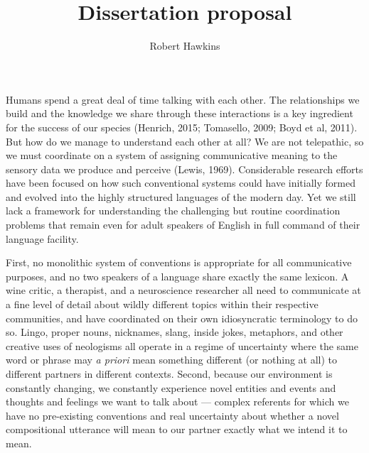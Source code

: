 \documentclass[12pt, donotrepeattitle, man, floatsintext]{apa6}
\title{Dissertation proposal}
\author{Robert Hawkins}
\affiliation{Stanford University}
\begin{document}
\thispagestyle{otherpage}

\maketitle

Humans spend a great deal of time talking with each other. The relationships we build and the knowledge we share through these interactions is a key ingredient for the success of our species (Henrich, 2015; Tomasello, 2009; Boyd et al, 2011). But how do we manage to understand each other at all? We are not telepathic, so we must coordinate on a system of assigning communicative meaning to the sensory data we produce and perceive (Lewis, 1969). Considerable research efforts have been focused on how such conventional systems could have initially formed and evolved into the highly structured languages of the modern day. Yet we still lack a framework for understanding the challenging but routine coordination problems that remain even for adult speakers of English in full command of their language facility. 

First, no monolithic system of conventions is appropriate for all communicative purposes, and no two speakers of a language share exactly the same lexicon. A wine critic, a therapist, and a neuroscience researcher all need to communicate at a fine level of detail about wildly different topics within their respective communities, and have coordinated on their own idiosyncratic terminology to do so. Lingo, proper nouns, nicknames, slang, inside jokes, metaphors, and other creative uses of neologisms all operate in a regime of uncertainty where the same word or phrase may \emph{a priori} mean something different (or nothing at all) to different partners in different contexts. Second, because our environment is constantly changing, we constantly experience novel entities and events and thoughts and feelings we want to talk about --- complex referents for which we have no pre-existing conventions and real uncertainty about whether a novel compositional utterance will mean to our partner exactly what we intend it to mean. 
\end{document}

